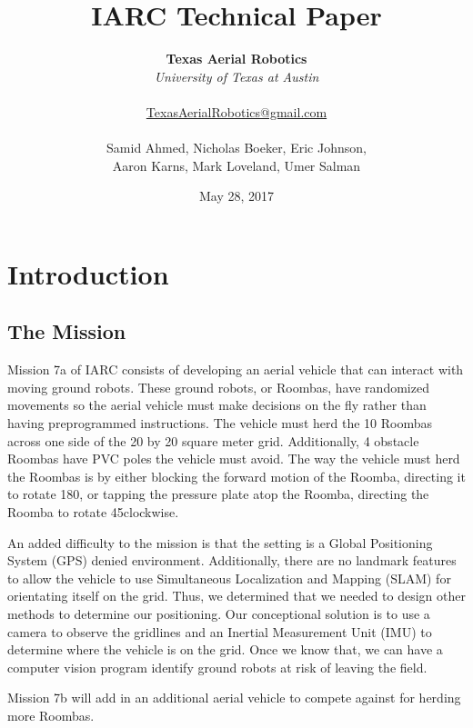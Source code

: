 \documentclass[12pt]{article}
\title{IARC Technical Paper}
\author{
	\textbf{Texas Aerial Robotics} \\ 
	\textit{University of Texas at Austin} \\ \\ 
	\href{mailto:TexasAerialRobotics@gmail.com}{TexasAerialRobotics@gmail.com} \\ \\ 
	Samid Ahmed, Nicholas Boeker, Eric Johnson, \\ Aaron Karns, Mark Loveland, Umer Salman}
\date{May 28, 2017}
\begin{document}
\maketitle
\thispagestyle{empty}


\pagebreak
\tableofcontents

\pagebreak

\section{Introduction}
\subsection{The Mission}
Mission 7a of IARC consists of developing an aerial vehicle that can interact with moving ground robots. These ground robots, or Roombas, have randomized movements so the aerial vehicle must make decisions on the fly rather than having preprogrammed instructions. The vehicle must herd the 10 Roombas across one side of the 20 by 20 square meter grid. Additionally, 4 obstacle Roombas have PVC poles the vehicle must avoid. The way the vehicle must herd the Roombas is by either blocking the forward motion of the Roomba, directing it to rotate 180\degree, or tapping the pressure plate atop the Roomba, directing the Roomba to rotate 45\degree clockwise. 

An added difficulty to the mission is that the setting is a Global Positioning System (GPS) denied environment. Additionally, there are no landmark features to allow the vehicle to use Simultaneous Localization and Mapping (SLAM) for orientating itself on the grid. Thus, we determined that we needed to design other methods to determine our positioning. Our conceptional solution is to use a camera to observe the gridlines and an Inertial Measurement Unit (IMU) to determine where the vehicle is on the grid. Once we know that, we can have a computer vision program identify ground robots at risk of leaving the field. 

Mission 7b will add in an additional aerial vehicle to compete against for herding more Roombas. 
\end{document}

